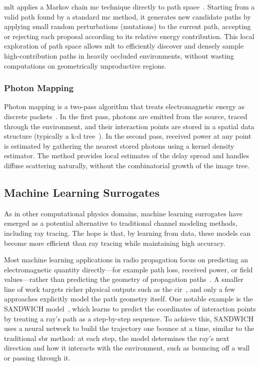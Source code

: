 \Gls{mlt} applies a Markov chain \gls{mc} technique directly to path space~. Starting from a valid path found by a standard \gls{mc} method, it generates new candidate paths by applying small random perturbations (mutations) to the current path, accepting or rejecting each proposal according to its relative energy contribution. This local exploration of path space allows \gls{mlt} to efficiently discover and densely sample high-contribution paths in heavily occluded environments, without wasting computations on geometrically unproductive regions.

\subsubsection{Photon Mapping}

Photon mapping is a two-pass algorithm that treats electromagnetic energy as discrete packets~. In the first pass, photons are emitted from the source, traced through the environment, and their interaction points are stored in a spatial data structure (typically a k-d tree~). In the second pass, received power at any point is estimated by gathering the nearest stored photons using a kernel density estimator. The method provides local estimates of the delay spread and handles diffuse scattering naturally, without the combinatorial growth of the image tree.

\subsection{Machine Learning Surrogates}

As in other computational physics domains, machine learning surrogates have emerged as a potential alternative to traditional channel modeling methods, including ray tracing. The hope is that, by learning from data, these models can become more efficient than ray tracing while maintaining high accuracy.

Most machine learning applications in radio propagation focus on predicting an electromagnetic quantity directly---for example path loss, received power, or field values---rather than predicting the geometry of propagation paths~. A smaller line of work targets richer physical outputs such as the \gls{cir}~, and only a few approaches explicitly model the path geometry itself. One notable example is the SANDWICH model~, which learns to predict the coordinates of interaction points by treating a ray's path as a step-by-step sequence. To achieve this, SANDWICH uses a neural network to build the trajectory one bounce at a time, similar to the traditional \gls{sbr} method: at each step, the model determines the ray's next direction and how it interacts with the environment, such as bouncing off a wall or passing through it.

